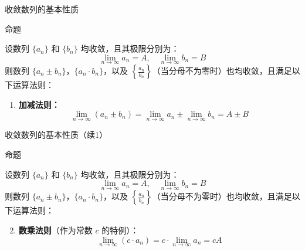 \documentclass[aspectratio=169,10pt,fontset=fandol]{ctexbeamer}
\begin{document}
\begin{frame}[t,fragile]{收敛数列的基本性质}
\footnotesize
\begin{block}{命题}
{\footnotesize



设数列 $\{a_n\}$ 和 $\{b_n\}$ 均收敛，且其极限分别为：
\begin{equation*}
	\lim\limits_{n \to \infty} a_n = A, \quad \lim\limits_{n \to \infty} b_n = B
\end{equation*}
则数列 $\{a_n \pm b_n\}$，$\{a_n \cdot b_n\}$，以及 $\left\{\frac{a_n}{b_n}\right\}$（当分母不为零时）也均收敛，且满足以下运算法则：

\begin{enumerate}
	\item \textbf{加减法则：}
	\begin{equation*}
		\lim\limits_{n \to \infty} (a_n \pm b_n) = \lim\limits_{n \to \infty} a_n \pm \lim\limits_{n \to \infty} b_n = A \pm B
	\end{equation*}
	
	
\end{enumerate}
}
\end{block}
\end{frame}
\begin{frame}[t,fragile]{收敛数列的基本性质（续1）}
\footnotesize
\begin{block}{命题}
{\footnotesize



设数列 $\{a_n\}$ 和 $\{b_n\}$ 均收敛，且其极限分别为：
\begin{equation*}
	\lim\limits_{n \to \infty} a_n = A, \quad \lim\limits_{n \to \infty} b_n = B
\end{equation*}
则数列 $\{a_n \pm b_n\}$，$\{a_n \cdot b_n\}$，以及 $\left\{\frac{a_n}{b_n}\right\}$（当分母不为零时）也均收敛，且满足以下运算法则：

\begin{enumerate}
	\setcounter{enumi}{1}
\item \textbf{数乘法则}（作为常数 $c$ 的特例）：
	\begin{equation*}
		\lim\limits_{n \to \infty} (c \cdot a_n) = c \cdot \lim\limits_{n \to \infty} a_n = cA
	\end{equation*}
	
	
\end{enumerate}
}
\end{block}
\end{frame}
\end{document}
